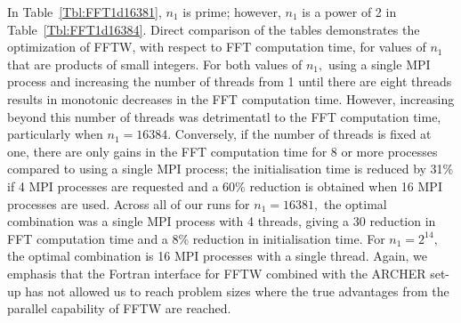 \documentclass[a4]{article}
\begin{document}
 
In Table~\ref{Tbl:FFT1d16381}, $n_1$ is prime; however, $n_1$ is a power of 2 
in Table~\ref{Tbl:FFT1d16384}. Direct comparison of the tables demonstrates the 
optimization of FFTW, with respect to FFT computation time, for values of $n_1$ 
that are products of small integers. For both values of $n_1,$ using a single 
MPI process and increasing the number of threads from 1 until there are eight 
threads results in monotonic decreases in the FFT computation time. However, 
increasing beyond this number of threads was detrimentatl to the FFT computation 
time, particularly when $n_1=16384.$ Conversely, if the number of threads is 
fixed at one, there are only gains in the FFT computation time for 8 or more 
processes compared to using a single MPI process; the initialisation time is 
reduced by 31\% if 4 MPI processes are requested and a 60\% reduction is 
obtained when 16 MPI processes are used. Across all of our runs for $n_1=16381,$ 
the optimal combination was a single MPI process with 4 threads, giving a 30%
reduction in FFT computation time and a 8\% reduction in initialisation time. 
For $n_1=2^{14},$ the optimal combination is 16 MPI processes with a single thread. 
Again, we emphasis that the Fortran interface for FFTW combined with the ARCHER 
set-up has not allowed us to reach problem sizes where the true advantages from 
the parallel capability of FFTW are reached.
\end{document}
